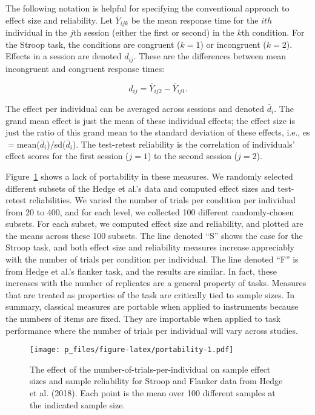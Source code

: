 \documentclass[english,man]{apa6}
\theoremstyle{definition}
\theoremstyle{definition}
\theoremstyle{remark}
\begin{document}
The following notation is helpful for specifying the conventional
approach to effect size and reliability. Let \(\bar{Y}_{ijk}\) be the
mean response time for the \(ith\) individual in the \(j\)th session
(either the first or second) in the \(k\)th condition. For the Stroop
task, the conditions are congruent (\(k=1\)) or incongruent (\(k=2\)).
Effects in a session are denoted \(d_{ij}\). These are the differences
between mean incongruent and congruent response times:

\begin{equation} \label{samp.eff}
d_{ij}=\bar{Y}_{ij2}-\bar{Y}_{ij1}. 
\end{equation}

The effect per individual can be averaged across sessions and denoted
\(\bar{d}_{i}\). The grand mean effect is just the mean of these
individual effects; the effect size is just the ratio of this grand mean
to the standard deviation of these effects, i.e.,
es\(=\)mean(\(\bar{d}_{i}\))\(/\)sd(\(\bar{d}_{i}\)). The test-retest
reliability is the correlation of individuals' effect scores for the
first session (\(j=1\)) to the second session (\(j=2\)).

Figure~\ref{fig:portability} shows a lack of portability in these
measures. We randomly selected different subsets of the Hedge et al.'s
data and computed effect sizes and test-retest reliabilities. We varied
the number of trials per condition per individual from 20 to 400, and
for each level, we collected 100 different randomly-chosen subsets. For
each subset, we computed effect size and reliability, and plotted are
the means across these 100 subsets. The line denoted \enquote{S} shows
the case for the Stroop task, and both effect size and reliability
measures increase appreciably with the number of trials per condition
per individual. The line denoted \enquote{F} is from Hedge et al.'s
flanker task, and the results are similar. In fact, these increases with
the number of replicates are a general property of tasks. Measures that
are treated as properties of the task are critically tied to sample
sizes. In summary, classical measures are portable when applied to
instruments because the numbers of items are fixed. They are importable
when applied to task performance where the number of trials per
individual will vary across studies.

\begin{figure}[htbp]
\centering
\texttt{[image: p\_files/figure-latex/portability-1.pdf]}
\caption{\label{fig:portability}The effect of the
number-of-trials-per-individual on sample effect sizes and sample
reliability for Stroop and Flanker data from Hedge et al. (2018). Each
point is the mean over 100 different samples at the indicated sample
size.}
\end{figure}
\end{document}
